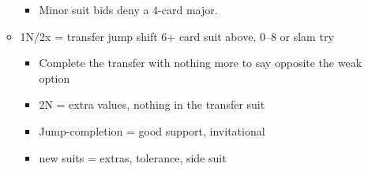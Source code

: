 \documentclass[a4paper,14pt]{extarticle}
\begin{document}
\begin{itemize}
\begin{itemize}
\begin{itemize}
      \item Minor suit bids deny a 4-card major.
		\end{itemize}
   \item 1N/2x = transfer jump shift 6+ card suit above, 0--8 or slam try
		\begin{itemize}
		\item Complete the transfer with nothing more to say opposite the weak option
		\item 2N = extra values, nothing in the transfer suit
		\item Jump-completion = good support, invitational
		\item new suits = extras, tolerance, side suit
		\end{itemize}
	\end{itemize}

\newpage


\end{itemize}
\end{document}
